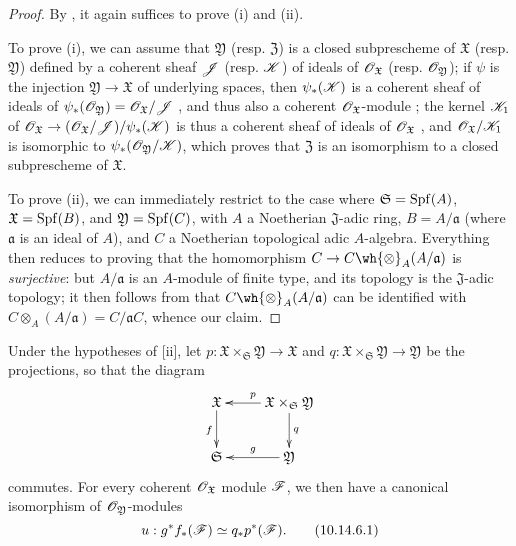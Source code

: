 \begin{proof}
\label{proof-1.10.14.5}
By , it again suffices to prove (i) and (ii).

To prove (i), we can assume that $\mathfrak{Y}$ (resp. $\mathfrak{Z}$) is a closed subprescheme of $\mathfrak{X}$ (resp. $\mathfrak{Y}$) defined by a coherent sheaf $\mathscr{J}$ (resp. $\mathscr{K}$) of ideals of $\mathscr{O}_\mathfrak{X}$ (resp. $\mathscr{O}_\mathfrak{Y}$);
if $\psi$ is the injection $\mathfrak{Y}\to\mathfrak{X}$ of underlying spaces, then $\psi_*(\mathscr{K})$ is a coherent sheaf of ideals of $\psi_*(\mathscr{O}_\mathfrak{Y})=\mathscr{O}_\mathfrak{X}/\mathscr{J}$ , and thus also a coherent $\mathscr{O}_\mathfrak{X}$-module ;
the kernel $\mathscr{K}_1$ of $\sh{O}_\mathfrak{X}\to(\sh{O}_\mathfrak{X}/\sh{J})/\psi_*(\sh{K})$ is thus a coherent sheaf of ideals of $\mathscr{O}_\mathfrak{X}$ , and $\mathscr{O}_\mathfrak{X}/\mathscr{K}_1$ is isomorphic to $\psi_*(\mathscr{O}_\mathfrak{Y}/\mathscr{K})$, which proves that $\mathfrak{Z}$ is an isomorphism to a closed subprescheme of $\mathfrak{X}$.

To prove (ii), we can immediately restrict to the case where $\mathfrak{S}=\operatorname{Spf}(A)$, $\mathfrak{X}=\operatorname{Spf}(B)$, and $\mathfrak{Y}=\operatorname{Spf}(C)$, with $A$ a Noetherian $\mathfrak{J}$-adic ring, $B=A/\mathfrak{a}$ (where $\mathfrak{a}$ is an ideal of $A$), and $C$ a Noetherian topological adic $A$-algebra.
Everything then reduces to proving that the homomorphism $C\to C\wh{\otimes}_A(A/\mathfrak{a})$ is \emph{surjective}:
but $A/\mathfrak{a}$ is an $A$-module of finite type, and its topology is the $\mathfrak{J}$-adic topology;
it then follows from  that $C\wh{\otimes}_A(A/\mathfrak{a})$ can be identified with $C\otimes_A(A/\mathfrak{a})=C/\mathfrak{a}C$, whence our claim.
\end{proof}

\begin{corollary}[10.14.6]
\label{1.10.14.6}
Under the hypotheses of [ii], let $p:\mathfrak{X}\times_\mathfrak{S}\mathfrak{Y}\to\mathfrak{X}$ and $q:\mathfrak{X}\times_\mathfrak{S}\mathfrak{Y}\to\mathfrak{Y}$ be the projections, so that the diagram
\[
  \xymatrix{
    \mathfrak{X}\ar[d]_f &
    \mathfrak{X}\times_\mathfrak{S}\mathfrak{Y}\ar[l]_p\ar[d]^q\\
    \mathfrak{S} &
    \mathfrak{Y}\ar[l]_g
  }
\]
commutes.
For every coherent $\mathscr{O}_\mathfrak{X}$ module $\mathscr{F}$, we then have a canonical isomorphism of $\mathscr{O}_\mathfrak{Y}$-modules
\begin{equation*}
\label{1.10.14.6.1}
  u:g^*f_*(\mathscr{F})\simeq q_*p^*(\mathscr{F}).
  \tag{10.14.6.1}
\end{equation*}
\end{corollary}

